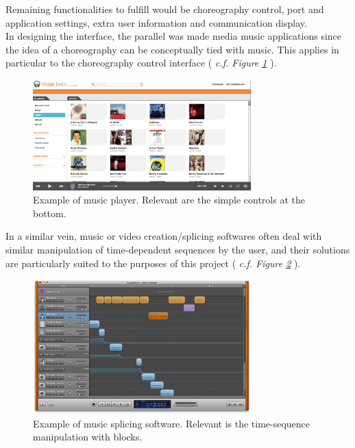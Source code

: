 Remaining functionalities to fulfill would be choreography control, port and application settings, extra user information and communication display.\\

In designing the interface, the parallel was made media music applications since the idea of a choreography can be conceptually tied with music. This applies in particular to the choreography control interface ( \textit{c.f. Figure \ref{img:GoogleMusic}} ).\\

\begin{figure}[ht]
   \centering
   \includegraphics[width=0.75\textwidth]{img/GoogleMusic.png}
   \caption{Example of music player. Relevant are the simple controls at the bottom.}
   \label{img:GoogleMusic}
\end{figure}

In a similar vein, music or video creation/splicing softwares often deal with similar manipulation of time-dependent sequences by the user, and their solutions are particularly suited to the purposes of this project ( \textit{c.f. Figure \ref{img:MusicEditor}} ).\\

\begin{figure}[ht]
   \centering
   \includegraphics[width=0.75\textwidth]{img/MusicEditor.png}
   \caption{Example of music splicing software. Relevant is the time-sequence manipulation with blocks.}
   \label{img:MusicEditor}
\end{figure}


